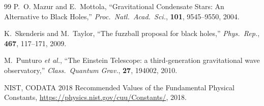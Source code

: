 \documentclass[12pt]{article}
\begin{document}
\begin{thebibliography}{99}
P.~O. Mazur and E.~Mottola,
``Gravitational Condensate Stars: An Alternative to Black Holes,''
\textit{Proc.\ Natl.\ Acad.\ Sci.}, \textbf{101}, 9545--9550, 2004.

K.~Skenderis and M.~Taylor,
``The fuzzball proposal for black holes,''
\textit{Phys.\ Rep.}, \textbf{467}, 117--171, 2009.

M.~Punturo \textit{et al.},
``The Einstein Telescope: a third-generation gravitational wave observatory,''
\textit{Class.\ Quantum Grav.}, \textbf{27}, 194002, 2010.

NIST, CODATA 2018 Recommended Values of the Fundamental Physical
Constants, \url{https://physics.nist.gov/cuu/Constants/}, 2018.

\end{thebibliography}
\end{document}
